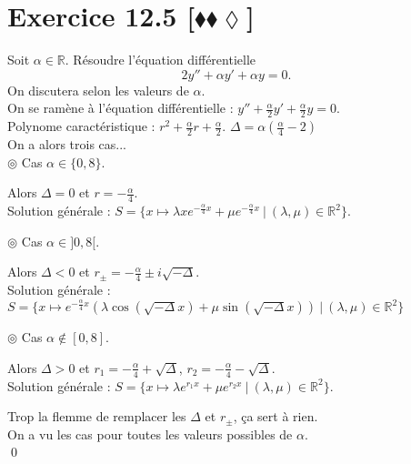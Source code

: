 \documentclass[10pt]{article}
\begin{document}
\section*{Exercice 12.5 [$\blacklozenge\blacklozenge\lozenge$]}
\begin{tcolorbox}[enhanced, width=7in, center, size=fbox, fontupper=\large, drop shadow southwest]
    Soit $\alpha\in\mathbb{R}$. Résoudre l'équation différentielle
    \begin{equation*}
        2y'' + \alpha y' + \alpha y = 0.
    \end{equation*}
    On discutera selon les valeurs de $\alpha$.\\[0.1cm]
    On se ramène à l'équation différentielle : $y'' + \frac{\alpha}{2}y' + \frac{\alpha}{2}y = 0$.\\
    Polynome caractéristique : $r^2 + \frac{\alpha}{2}r + \frac{\alpha}{2}$. $\Delta=\alpha(\frac{\alpha}{4}-2)$\\
    On a alors trois cas...\\
    $\circledcirc$ Cas $\alpha\in\{0, 8\}$.
    \begin{adjustwidth}{1cm}{}
        Alors $\Delta=0$ et $r=-\frac{\alpha}{4}$.\\
        Solution générale : $S = \{x\mapsto \lambda x e^{-\frac{\alpha}{4}x} + \mu e^{-\frac{\alpha}{4}x} ~ | ~ (\lambda, \mu)\in\mathbb{R}^2\}$.
    \end{adjustwidth}
    $\circledcirc$ Cas $\alpha\in]0,8[$.
    \begin{adjustwidth}{1cm}{}
        Alors $\Delta<0$ et $r_\pm = -\frac{\alpha}{4} \pm i\sqrt{-\Delta}$.\\
        Solution générale : $S = \{x\mapsto e^{-\frac{\alpha}{4}x} \left( \lambda \cos(\sqrt{-\Delta}x) + \mu\sin(\sqrt{-\Delta}x) \right) ~ | ~  (\lambda,\mu)\in\mathbb{R}^2\}$
    \end{adjustwidth}
    $\circledcirc$ Cas $\alpha\notin[0,8]$.
    \begin{adjustwidth}{1cm}{}
        Alors $\Delta>0$ et $r_1 = -\frac{\alpha}{4} + \sqrt{\Delta}$, $r_2 = -\frac{\alpha}{4} - \sqrt{\Delta}$.\\
        Solution générale : $S=\{x\mapsto \lambda e^{r_1x} + \mu e^{r_2x} ~ | ~ (\lambda,\mu)\in\mathbb{R}^2\}$.
    \end{adjustwidth}
    Trop la flemme de remplacer les $\Delta$ et $r_\pm$, ça sert à rien.\\
    On a vu les cas pour toutes les valeurs possibles de $\alpha$.\\
    \qed
\end{tcolorbox}
\end{document}
